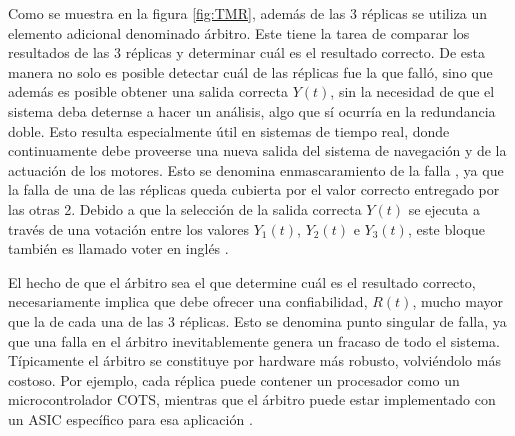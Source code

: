 

Como se muestra en la figura \ref{fig:TMR}, además de las 3 réplicas se utiliza un elemento adicional denominado árbitro. Este tiene la tarea de comparar los resultados de las 3 réplicas y determinar cuál es el resultado correcto. De esta manera no solo es posible detectar cuál de las réplicas fue la que falló, sino que además es posible obtener una salida correcta $Y(t)$, sin la necesidad de que el sistema deba deternse a hacer un análisis, algo que sí ocurría en la redundancia doble. Esto resulta especialmente útil en sistemas de tiempo real, donde continuamente debe proveerse una nueva salida del sistema de navegación y de la actuación de los motores. Esto se denomina enmascaramiento de la falla \cite{nelson1990fault}, ya que la falla de una de las réplicas queda cubierta por el valor correcto entregado por las otras 2. Debido a que la selección de la salida correcta $Y(t)$ se ejecuta a través de una votación entre los valores $Y_1(t)$, $Y_2(t)$ e $Y_3(t)$, este bloque también es llamado voter en inglés \cite{lyons1962use}.

El hecho de que el árbitro sea el que determine cuál es el resultado correcto, necesariamente implica que debe ofrecer una confiabilidad, $R(t)$, mucho mayor que la de cada una de las 3 réplicas. Esto se denomina punto singular de falla, ya que una falla en el árbitro inevitablemente genera un fracaso de todo el sistema. Típicamente el árbitro se constituye por hardware más robusto, volviéndolo más costoso. Por ejemplo, cada réplica puede contener un procesador como un microcontrolador COTS, mientras que el árbitro puede estar implementado con un ASIC específico para esa aplicación \cite{hiergeist2017internal}.


